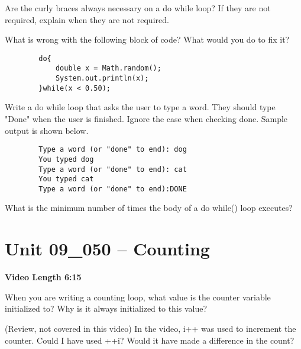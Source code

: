 \documentclass[letterpaper,12pt]{exam}
\newcommand{\unit}{Unit 09}
\begin{document}
\begin{questions}
\begin{samepage}
    \question Are the curly braces always necessary on a do while loop?  If they are not required, explain when they are not required.
    \vspace{5mm}
\end{samepage}


\begin{samepage}
    \question What is wrong with the following block of code?  What would you do to fix it?
    \begin{verbatim}
        do{
            double x = Math.random();
            System.out.println(x);
        }while(x < 0.50);
    \end{verbatim}
    \vspace{5mm}
\end{samepage}
\begin{samepage}
    \question Write a do while loop that asks the user to type a word.  They should type "Done" when the user is finished.  Ignore the case when checking done.  Sample output is shown below.
    \begin{verbatim}
        Type a word (or "done" to end): dog 
        You typed dog
        Type a word (or "done" to end): cat 
        You typed cat
        Type a word (or "done" to end):DONE 
    \end{verbatim}     
       \vspace{15mm}
\end{samepage}

\begin{samepage}
    \question What is the minimum number of times the body of a do{} while() loop executes?
    \vspace{5mm}
\end{samepage}



\section*{\unit\_050 -- Counting} %
\par{\selectfont\textbf{Video Length 6:15}}

\begin{samepage}
    \question When you are writing a counting loop, what value is the counter variable initialized to?  Why is it always initialized to this value?
    \vspace{5mm}
\end{samepage}
\begin{samepage}
    \question (Review, not covered in this video)  In the video, i++ was used to increment the counter.  Could I have used ++i?  Would it have made a difference in the count?
    \vspace{5mm}
\end{samepage}


\end{questions}
\end{document}
